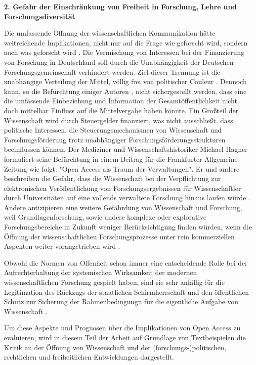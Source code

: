 \textbf{2. Gefahr der Einschränkung von Freiheit in Forschung, Lehre und Forschungsdiversität}

Die umfassende Öffnung der wissenschaftlichen Kommunikation hätte weitreichende Implikationen, nicht nur auf die Frage wie geforscht wird, sondern auch was geforscht wird \cite{suchen}. Die Vermischung von Interessen bei der Finanzierung von Forschung in Deutschland soll durch die Unabhängigkeit der Deutschen Forschungsgemeinschaft verhindert werden. Ziel dieser Trennung ist die unabhängige Verteilung der Mittel, völlig frei von politischer Couleur \cite{suchen}. Dennoch kann, so die Befürchtung einiger Autoren \cite{suchen}, nicht sichergestellt werden, dass eine die umfassende Einbeziehung und Information der Gesamtöffentlichkeit nicht doch mittelbar Einfluss auf die Mittelvergabe haben könnte. Ein Großteil der Wissenschaft wird durch Steuergelder finanziert, was nicht ausschließt, dass politische Interessen, die Steuerungsmechanismen von Wissenschaft und Forschungsförderung trotz unabhängiger Forschungsförderungsstrukturen beeinflussen können. Der Mediziner und Wissenschaftshistoriker Michael Hagner formuliert seine Befürchtung in einem Beitrag für die Frankfurter Allgemeine Zeitung wie folgt: "Open Access als Traum der Verwaltungen". Er und andere beschreiben die Gefahr, dass die Wissenschaft bei der Verpflichtung zur elektronischen Veröffentlichung von Forschungsergebnissen für Wissenschaftler durch Universitäten auf eine vollends verwaltete Forschung hinaus laufen würde \cite{hagner_faz_2009}. Andere antizipieren eine weitere Gefährdung von Wissenschaft und Forschung, weil Grundlagenforschung, sowie andere komplexe oder explorative Forschungsbereiche in Zukunft weniger Berücksichtigung finden würden, wenn die Öffnung der wissenschaftlichen Forschungsprozesse unter rein kommerziellen Aspekten weiter vorangetrieben wird \cite{suchen}.

Obwohl die Normen von Offenheit schon immer eine entscheidende Rolle bei der Aufrechterhaltung der systemischen Wirksamkeit der modernen wissenschaftlichen Forschung gespielt haben, sind sie sehr anfällig für die Legitimation des Rückzugs der staatlichen Schirmherrschaft und den öffentlichen Schutz zur Sicherung der Rahmenbedingungn für die eigentliche Aufgabe von Wissenschaft \cite{david1998_common}.

Um diese Aspekte und Prognosen über die Implikationen von Open Access zu evaluieren, wird in diesem Teil der Arbeit auf Grundlage von Textbeispielen die Kritik an der Öffnung von Wissenschaft und der (forschungs-)politischen, rechtlichen und freiheitlichen Entwicklungen dargestellt.

